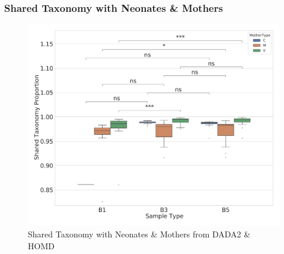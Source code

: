 \documentclass{beamer}
\begin{document}
    \begin{frame}
        \frametitle{Shared Taxonomy with Neonates \& Mothers}

        \begin{figure}
            \includegraphics[width=0.6 \linewidth]{figures/Step48/everything.DADA2.homd.pdf}
            \caption{Shared Taxonomy with Neonates \& Mothers from DADA2 \& HOMD}
        \end{figure}
    \end{frame}
\end{document}
